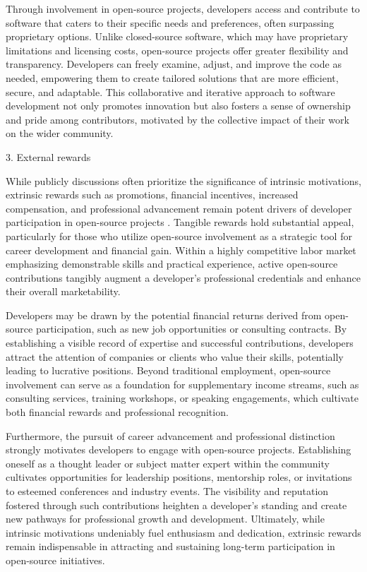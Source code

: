 Through involvement in open-source projects, developers access and contribute to software that caters to their specific needs and preferences, often surpassing proprietary options. Unlike closed-source software, which may have proprietary limitations and licensing costs, open-source projects offer greater flexibility and transparency. Developers can freely examine, adjust, and improve the code as needed, empowering them to create tailored solutions that are more efficient, secure, and adaptable. This collaborative and iterative approach to software development not only promotes innovation but also fosters a sense of ownership and pride among contributors, motivated by the collective impact of their work on the wider community.


3. External rewards

While publicly discussions often prioritize the significance of intrinsic motivations, extrinsic rewards such as promotions, financial incentives, increased compensation, and professional advancement remain potent drivers of developer participation in open-source projects \cite{05bitzer2007intrinsic,06ye2003toward,07zhao2024openrank,11gerosa2021shifting,13li2012leadership,15roberts2006understanding,17alexander2002working,18oreg2008exploring}. Tangible rewards hold substantial appeal, particularly for those who utilize open-source involvement as a strategic tool for career development and financial gain. Within a highly competitive labor market emphasizing demonstrable skills and practical experience, active open-source contributions tangibly augment a developer's professional credentials and enhance their overall marketability.

Developers may be drawn by the potential financial returns derived from open-source participation, such as new job opportunities or consulting contracts. By establishing a visible record of expertise and successful contributions, developers attract the attention of companies or clients who value their skills, potentially leading to lucrative positions. Beyond traditional employment, open-source involvement can serve as a foundation for supplementary income streams, such as consulting services, training workshops, or speaking engagements, which cultivate both financial rewards and professional recognition.

Furthermore, the pursuit of career advancement and professional distinction strongly motivates developers to engage with open-source projects. Establishing oneself as a thought leader or subject matter expert within the community cultivates opportunities for leadership positions, mentorship roles, or invitations to esteemed conferences and industry events.  The visibility and reputation fostered through such contributions heighten a developer's standing and create new pathways for professional growth and development.  Ultimately, while intrinsic motivations undeniably fuel enthusiasm and dedication,  extrinsic rewards remain indispensable in attracting and sustaining long-term participation in open-source initiatives.

